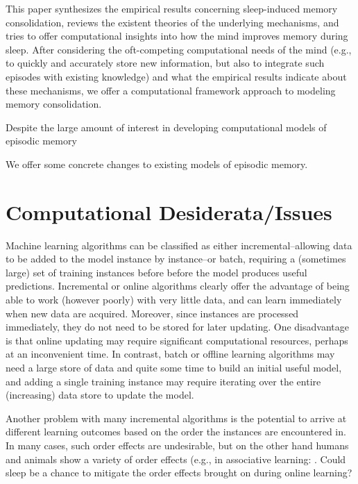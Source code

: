 \documentclass[10pt,letterpaper]{article}
\begin{document}
This paper synthesizes the empirical results concerning sleep-induced memory consolidation, reviews the existent theories of the underlying mechanisms, and tries to offer computational insights into how the mind improves memory during sleep. After considering the oft-competing computational needs of the mind (e.g., to quickly and accurately store new information, but also to integrate such episodes with existing knowledge) and what the empirical results indicate about these mechanisms, we offer a computational framework approach to modeling memory consolidation. 

Despite the large amount of interest in developing computational models of episodic memory \cite{Nelson:2013}

We offer some concrete changes to existing models of episodic memory.

\section{Computational Desiderata/Issues}

Machine learning algorithms can be classified as either incremental--allowing data to be added to the model instance by instance--or batch, requiring a (sometimes large) set of training instances before before the model produces useful predictions. Incremental or online algorithms clearly offer the advantage of being able to work (however poorly) with very little data, and can learn immediately when new data are acquired. Moreover, since instances are processed immediately, they do not need to be stored for later updating. One disadvantage is that online updating may require significant computational resources, perhaps at an inconvenient time. In contrast, batch or offline learning algorithms may need a large store of data and quite some time to build an initial useful model, and adding a single training instance may require iterating over the entire (increasing) data store to update the model. 

Another problem with many incremental algorithms is the potential to arrive at different learning outcomes based on the order the instances are encountered in. In many cases, such order effects are undesirable, but on the other hand humans and animals show a variety of order effects (e.g., in associative learning: . Could sleep be a chance to mitigate the order effects brought on during online learning? %
\end{document}
